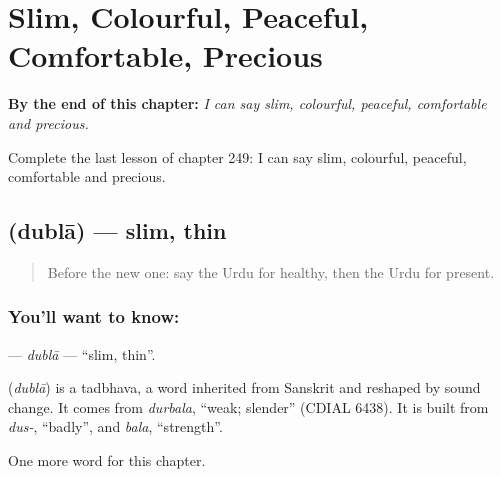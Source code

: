 
\chapter{Slim, Colourful, Peaceful, Comfortable, Precious}
\label{ch:ur-slim-colourful-peaceful-comfortable-precious}

\begin{chapteropening}
\textbf{By the end of this chapter:} \emph{I can say slim, colourful, peaceful, comfortable and precious.}

Complete the last lesson of chapter 249: I can say slim, colourful, peaceful, comfortable and precious.
\end{chapteropening}

\section[\texorpdfstring{\ur{دبلا} (dublā)}{دبلا (dublā)}]{ (dublā) — slim, thin}

\label{lesson:UR-C249-dubla}



\begin{quote}
Before the new one: say the Urdu for healthy, then the Urdu for present.
\end{quote}

\subsection*{You'll want to know: }
\textbf{} — \emph{dublā} — \textquotedblleft{}slim, thin\textquotedblright{}.

\begin{cousinweb}
\textbf{} (\emph{dublā}) is a tadbhava, a word inherited from Sanskrit and reshaped by sound change. It comes from \emph{durbala}, \textquotedblleft{}weak; slender\textquotedblright{} (CDIAL 6438). It is built from \emph{dus-}, \textquotedblleft{}badly\textquotedblright{}, and \emph{bala}, \textquotedblleft{}strength\textquotedblright{}.
\end{cousinweb}

\begin{grammarlens}[title={What you've built}]
One more word for this chapter.
\end{grammarlens}

